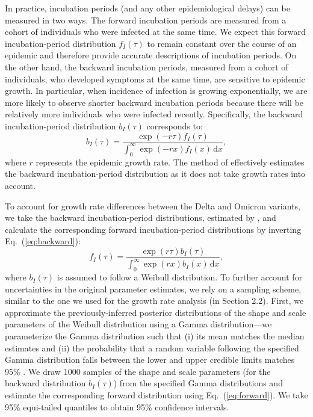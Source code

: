 \documentclass[12pt]{article}
\newcommand{\eref}[1]{Eq.~(\ref{eq:#1})}
\newcommand{\dd}[1]{\ensuremath{\, \mathrm{d}#1}}
\newcommand{\dx}{\dd{x}}
\begin{document}
In practice, incubation periods (and any other epidemiological delays) can be measured in two ways.
The forward incubation periods are measured from a cohort of individuals who were infected at the same time. 
We expect this forward incubation-period distribution $f_I(\tau)$ to remain constant over the course of an epidemic and therefore provide accurate descriptions of incubation periods.
On the other hand, the backward incubation periods, measured from a cohort of individuals, who developed symptoms at the same time, are sensitive to epidemic growth.
In particular, when incidence of infection is growing exponentially, we are more likely to observe shorter backward incubation periods because there will be relatively more individuals who were infected recently.
Specifically, the backward incubation-period distribution $b_I(\tau)$ corresponds to:
\begin{equation}
b_I(\tau) =\frac{ \exp(-r\tau) f_I(\tau)}{\int_0^\infty \exp(-r x) f_I(x)  \dx},
\label{eq:backward}
\end{equation}
where $r$ represents the epidemic growth rate.
The method of \cite{backer2020incubation} effectively estimates the backward incubation-period distribution as it does not take growth rates into account.

To account for growth rate differences between the Delta and Omicron variants, we take the backward incubation-period distributions, estimated by \cite{backer2021omicron}, and calculate the corresponding forward incubation-period distributions by inverting \eref{backward}:
\begin{equation}
f_I(\tau) = \frac{\exp(r\tau) b_I(\tau) }{\int_0^\infty \exp(rx)  b_I(x)\dx},
\label{eq:forward}
\end{equation}
where $b_I(\tau)$ is assumed to follow a Weibull distribution.
To further account for uncertainties in the original parameter estimates, we rely on a sampling scheme, similar to the one we used for the growth rate analysis (in Section 2.2).
First, we approximate the previously-inferred posterior distributions of the shape and scale parameters of the Weibull distribution using a Gamma distribution---we parameterize the Gamma distribution such that (i) its mean matches the median estimates and (ii) the probability that a random variable following the specified Gamma distribution falls between the lower and upper credible limits matches 95\% \citep{park2020reconciling}.
We draw 1000 samples of the shape and scale parameters (for the backward distribution $b_I(\tau)$) from the specified Gamma distributions and estimate the corresponding forward distribution using \eref{forward}.
We take 95\% equi-tailed quantiles to obtain 95\% confidence intervals. 
\end{document}

